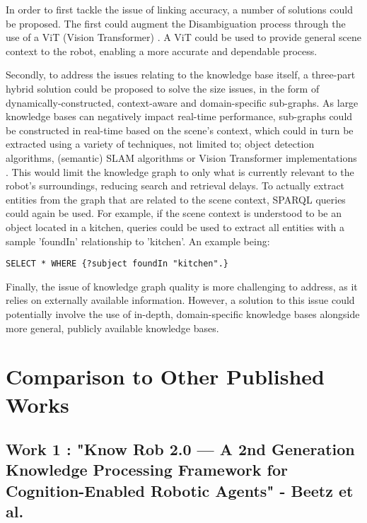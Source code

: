 \documentclass[a4paper,9pt]{scrartcl}
\begin{document}
In order to first tackle the issue of linking accuracy, a number of solutions could be proposed. The first could 
augment the Disambiguation process through the use of a ViT (Vision Transformer) \cite{dosovitskiyImageWorth16x162021}. A ViT could be used to provide
general scene context to the robot, enabling a more accurate and dependable process. 

Secondly, to address the issues relating to the knowledge base itself, a three-part hybrid solution could be proposed to solve the size issues, in the form of 
dynamically-constructed\cite{chenConstructingDynamicKnowledge2022}, context-aware \cite{panContextawareEntityTyping2021} and domain-specific  
\cite{abu-salihDomainspecificKnowledgeGraphs2021} sub-graphs. As large knowledge bases can negatively impact real-time performance, sub-graphs could 
be constructed in real-time based on the scene's context, which could in turn be extracted using a variety of techniques, not limited to; object detection 
algorithms, (semantic) SLAM algorithms \cite{liSDSLAMSemanticSLAM2024} or Vision Transformer implementations \cite{dosovitskiyImageWorth16x162021}. This would 
limit the knowledge graph to only what is currently relevant to the robot's surroundings, reducing search and retrieval delays. To actually extract entities from the graph 
that are related to the scene context, SPARQL \cite{SPARQL11Query} queries could again be used. For example, if the scene context is understood to be an object located in a kitchen, 
queries could be used to extract all entities with a sample 'foundIn' relationship to 'kitchen'. 
An example being: 
\begin{center}
\verb|SELECT * WHERE {?subject foundIn "kitchen".}|
\end{center}


Finally, the issue of knowledge graph quality is more challenging to address, as it relies on externally available information.
However, a solution to this issue could potentially involve the use of in-depth, domain-specific knowledge bases alongside more general, publicly available knowledge bases.



\section{Comparison to Other Published Works}


\subsection{Work 1 : "Know Rob 2.0 — A 2nd Generation Knowledge Processing Framework for Cognition-Enabled Robotic Agents" - Beetz et al.}
\end{document}
